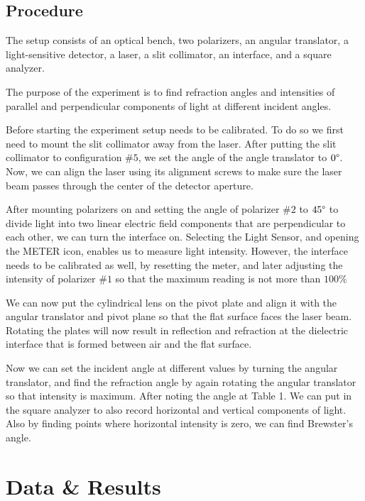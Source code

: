 \documentclass[10pt]{article}
\begin{document}
\subsection*{Procedure} 

The setup consists of an optical bench, two polarizers, an angular translator, a light-sensitive detector, a laser, a slit collimator, an interface, and a square analyzer.

The purpose of the experiment is to find refraction angles and intensities of parallel and perpendicular components of light at different incident angles.

Before starting the experiment setup needs to be calibrated. To do so we first need to mount the slit collimator away from the laser. After putting the slit collimator to configuration $\#5$, we set the angle of the angle translator to $0\degree$. Now, we can align the laser using its alignment screws to make sure the laser beam passes through the center of the detector aperture. 

After mounting polarizers on and setting the angle of polarizer $\#2$ to $45\degree$ to divide light into two linear electric field components that are perpendicular to each other, we can turn the interface on. Selecting the Light Sensor, and opening the METER icon, enables us to measure light intensity. However, the interface needs to be calibrated as well, by resetting the meter, and later adjusting the intensity of polarizer $\#1$ so that the maximum reading is not more than $100\%$

We can now put the cylindrical lens on the pivot plate and align it with the angular translator and pivot plane so that the flat surface faces the laser beam. Rotating the plates will now result in reflection and refraction at the dielectric interface that is formed between air and the flat surface.

Now we can set the incident angle at different values by turning the angular translator, and find the refraction angle by again rotating the angular translator so that intensity is maximum. After noting the angle at Table 1. We can put in the square analyzer to also record horizontal and vertical components of light. Also by finding points where horizontal intensity is zero, we can find Brewster's angle.
 
\section{Data \& Results}
\end{document}
